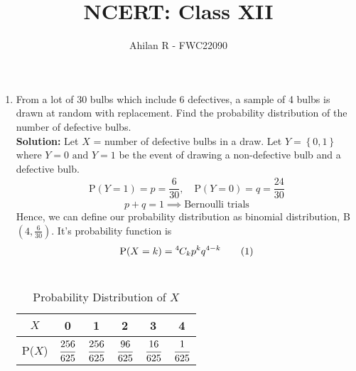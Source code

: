 \documentclass{article}
\providecommand{\brak}[1]{\ensuremath{\left(#1\right)}}
\providecommand{\cbrak}[1]{\ensuremath{\left\{#1\right\}}}
\newcommand{\solution}{\noindent \textbf{Solution: }}
\newcommand*{\permcomb}[4][0mu]{{{}^{#3}\mkern#1#2_{#4}}}
\newcommand*{\comb}[1][-1mu]{\permcomb[#1]{C}}
\newcommand\numberthis{\addtocounter{equation}{1}\tag{\theequation}}
\newcommand\T{\rule{0pt}{2.6ex}}       %
\begin{document}
\title{NCERT: Class XII}
\author{\Large Ahilan R - FWC22090}
\date{}

\maketitle

\begin{enumerate}[label=13.\arabic{enumi}.\arabic{enumii}]

\setcounter{enumi}{3}
\setcounter{enumii}{6}

\item From a lot of 30 bulbs which include 6 defectives, a sample of 4 bulbs is drawn at random with replacement. Find the probability distribution of the number of defective bulbs.\\[1ex]
	\solution
		Let $X$ = number of defective bulbs in a draw. Let $Y=\cbrak{0,1}$ where $Y=0 \text{ and } Y=1$ be the event of drawing a non-defective bulb and a defective bulb.
	\begin{align*}
		\text{P}\brak{Y=1}= p = \dfrac{6}{30}, \quad \text{P}\brak{Y=0}= q = \dfrac{24}{30}
	\end{align*}
		\[p+q=1 \implies \text{Bernoulli trials}\]
		Hence, we can define our probability distribution as binomial distribution, B$\brak{4,\frac{6}{30}}$. It's probability function is \[\text{P($X=k$)}=\comb{4}{k}p^kq^{4-k} \numberthis \]\\[-0.9cm]
	\begin{table}[h!]
	\normalsize
	\centering
			\begin{tabular}[20pt]{|c|c|c|c|c|c|} \hline		%
			$X$&0&1&2&3&4 \T \\ \hline
			P($X$)&$\cfrac{256}{625}$&$\cfrac{256}{625}$&$\cfrac{96}{625}$&$\cfrac{16}{625}$&$\cfrac{1}{625}$\\[1.5ex] \hline
		\end{tabular}\\[2ex]
		\caption{Probability Distribution of $X$}
	\end{table}

\noindent\fbox{%
    \parbox{\linewidth}{%
   	\url{https://github.com/ahilan22/fwc-2/tree/main/probability/assignment/codes/12-13-4-6.py}
    }%
}

\end{enumerate}
\end{document}
